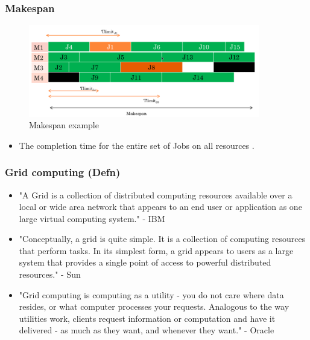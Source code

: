 \documentclass{beamer}
\begin{document}
\begin{frame}[label=supplement1]
 \frametitle{Makespan}
\begin{figure}[t]
\centering
\includegraphics[width=0.90\textwidth]{imgs/makespan}
\vspace{-7pt}
\caption{Makespan example}
\end{figure}
\begin{itemize}
	\item The completion time for the entire set of Jobs on all resources  \hyperlink{back1}{} \hyperlink{mkspn1}{}.
\end{itemize}
\end{frame}

\begin{frame}[label=supplement2]
 \frametitle{Grid computing (Defn)} 
\begin{itemize}
	\item "A  Grid  is  a  collection  of  distributed  computing resources  available  over  a  local  or  wide  area  network that appears to an end user or application as one large virtual computing system." - IBM 
	\item "Conceptually, a grid is quite simple. It is a collection of  computing  resources  that  perform  tasks.  In  its simplest form, a grid appears to users as a large system that  provides  a  single  point  of  access  to  powerful distributed resources." - Sun 
	\item "Grid computing is computing as a utility - you do not care  where  data  resides,  or  what  computer  processes  your  requests.  Analogous  to  the  way  utilities  work, clients request information or computation and have it delivered  -  as  much  as  they  want,  and  whenever  they want." - Oracle \hyperlink{back2}{}
\end{itemize}
\end{frame}
\end{document}
